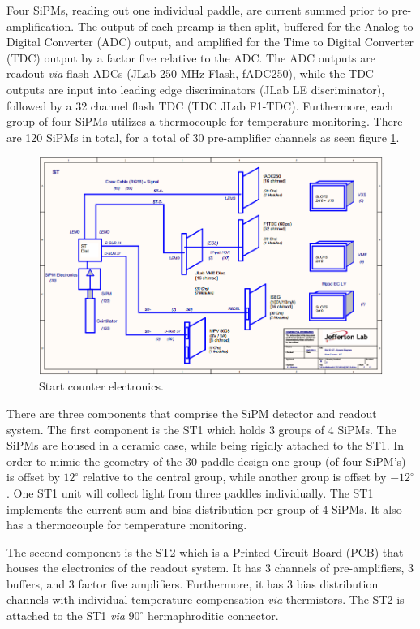 Four SiPMs, reading out one individual paddle, are current summed prior to pre-amplification.  The output of each preamp is then split, buffered for the Analog to Digital Converter (ADC) output, and amplified for the Time to Digital Converter (TDC) output by a factor five relative to the ADC.  The ADC outputs are readout \emph{via} flash ADCs (JLab 250 MHz Flash, fADC250), while the TDC outputs are input into leading edge discriminators (JLab LE discriminator), followed by a  32 channel flash TDC (TDC JLab F1-TDC).  Furthermore, each group of four SiPMs utilizes a thermocouple for temperature monitoring. There are 120 SiPMs in total, for a total of 30 pre-amplifier channels as seen figure \ref{fig:Start Counter Electronics}.
\begin{figure}[!htb]
	\centering
	\includegraphics[width=1.0\columnwidth]{design/figs/ST_Electronics}
	\caption[Start counter electronics]{Start counter electronics.}
	\label{fig:Start Counter Electronics}
\end{figure}

There are three components that comprise the SiPM detector and readout system.  The first component is the ST1 which holds 3 groups of 4 SiPMs.  The SiPMs are housed in a ceramic case, while being rigidly attached to the ST1.  In order to mimic the geometry of the 30 paddle design one group (of four SiPM's) is offset by $12^{\circ}$ relative to the central group, while another group is offset by $-12^{\circ}$.  One ST1 unit will collect light from three paddles individually.  The ST1 implements the current sum and bias distribution per group of 4 SiPMs.  It also has a thermocouple for temperature monitoring.  

The second component is the ST2 which is a Printed Circuit Board (PCB) that houses the electronics of the readout system.  It has 3 channels of pre-amplifiers, 3 buffers, and 3 factor five 
amplifiers.  Furthermore, it has 3 bias distribution channels with individual temperature compensation \emph{via} thermistors.  The ST2 is attached to the ST1 \emph{via} $90^{\circ}$ hermaphroditic connector.  

